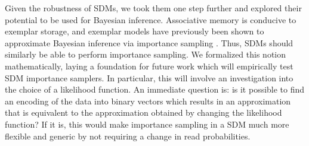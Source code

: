 \documentclass[10pt,letterpaper]{article}
\begin{document}
Given the robustness of SDMs, we took them one step further and
explored their potential to be used for Bayesian
inference. Associative memory is conducive to exemplar storage, and
exemplar models have previously been shown to approximate Bayesian
inference via importance sampling \cite{Shi2010}. Thus, SDMs should
similarly be able to perform importance sampling. We formalized this
notion mathematically, laying a foundation for future work which will
empirically test SDM importance samplers. In particular, this will
involve an investigation into the choice of a likelihood function. An
immediate question is: is it possible to find an encoding of the data
into binary vectors which results in an approximation that is
equivalent to the approximation obtained by changing the likelihood
function? If it is, this would make importance sampling in a SDM much
more flexible and generic by not requiring a change in read
probabilities.



\newpage


\setlength{\bibleftmargin}{.125in}
\setlength{\bibindent}{-\bibleftmargin}





\end{document}
